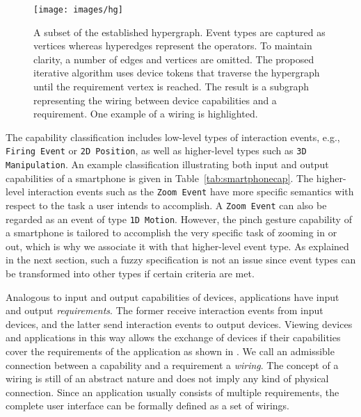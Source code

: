 \documentclass[twoside,twocolumn,10pt]{article}
\begin{document}
\begin{figure*}[t]
\centering
\texttt{[image: images/hg]}
\vskip-1mm
\caption{A subset of the established hypergraph. Event types are captured as vertices whereas hyperedges represent the operators. To maintain clarity, a number of edges and vertices are omitted. The proposed iterative algorithm uses device tokens that traverse the hypergraph until the requirement vertex is reached. The result is a subgraph representing the wiring between device capabilities and a requirement. One example of a wiring is highlighted.
}
\label{fig:hg}
\vskip-1mm
\end{figure*}

The capability classification includes low-level types of interaction events, e.g., \texttt{Firing Event} or \texttt{2D Position}, as well as higher-level types such as \texttt{3D Manipulation}.
An example classification illustrating both input and output capabilities of a smartphone is given in Table~\ref{tab:smartphonecap}.
The higher-level interaction events such as the \texttt{Zoom Event} have more specific semantics with respect to the task a user intends to accomplish.
A \texttt{Zoom Event} can also be regarded as an event of type \texttt{1D Motion}.
However, the pinch gesture capability of a smartphone is tailored to accomplish the very specific task of zooming in or out, which is why we associate it with that higher-level event type.
As explained in the next section, such a fuzzy specification is not an issue since event types can be transformed into other types if certain criteria are met.


Analogous to input and output capabilities of devices, applications have input and output \emph{requirements}. The former receive interaction events from input devices, and the latter send interaction events to output devices. Viewing devices and applications in this way allows the exchange of devices if their capabilities cover the requirements of the application as shown in .
We call an admissible connection between a capability and a requirement a \emph{wiring}. The concept of a wiring is still of an abstract nature and does not imply any kind of physical connection. Since an application usually consists of multiple requirements, the complete user interface can be formally defined as a set of wirings.
\end{document}
